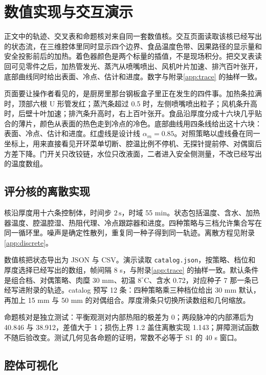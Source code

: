 \chapter{数值实现与交互演示}
\label{ch:demo}

正文中的轨迹、交叉表和命题核对来自同一套数值核。交互页面读取该核已经写出的状态流，在三维腔体里同时显示四个边界、食品温度色带、因果路径的显示量和安全投影前后的加热。着色器颜色是两个标量的插值，不是现场积分。把交叉表读回可见零件之后，加热管发光、蒸汽从喷嘴喷出、风机叶片加速、排汽百叶张开，底部曲线同时给出表面、冷点、估计和进度。数字与附录\ref{app:trace} 的抽样一致。

页面要让操作者看见的，是厨房里那台钢板盒子里正在发生的四件事。加热条拉满时，顶部六根 U 形管发红；蒸汽条超过 0.5 时，左侧喷嘴喷出粒子；风机条升高时，后壁十叶加速；排汽条升高时，右上百叶张开。食品沿厚度分成十六块几乎贴合的薄片，颜色从表面的热色走到冷点的冷色。底部曲线用四条线给出这十六块：表面、冷点、估计和进度。红虚线是设计线 \(\alpha_m=0.85\)。对照策略以虚线叠在同一坐标上，用来直接看见开环菜单切断、腔温比例不停机、无探针提前停、对偶窗后方差下降。门开关只改铰链，水位只改液面，二者进入安全侧测量，不改已经写出的温度数组。

\section{评分核的离散实现}

核沿厚度用十六条控制体，时间步 \(2\,\mathrm{s}\)，时域 55 min。状态包括温度、含水、加热器温度、腔温腔湿、热阻代理、冷点跟踪器和进度。四种策略与三档允许集合写在同一循环里。噪声是确定性散列，重复同一种子得到同一轨迹。离散方程见附录\ref{app:discrete}。

数值核把状态导出为 JSON 与 CSV。演示读取 \texttt{catalog.json}，按策略、档位和厚度选择已经写出的数组，帧间隔 8 s，与附录\ref{app:trace} 的抽样一致。默认条件是组合档、对偶策略、肉糜 30 mm、初温 \(8^\circ\mathrm{C}\)、含水 0.72，对应种子 7 那一条已经写进附录的轨迹。catalog 预写 12 条：四种策略乘三种档位给出 30 mm 默认，再加上 15 mm 与 50 mm 的对偶组合。厚度滑条只切换所读数组和几何缩放。

命题核对是独立测试：平衡观测对内部热阻的极差为 0；两段脉冲的内部滞后为 40.846 与 38.912，差值大于 1；损伤上界 1.2 盖住离散实现 1.143；屏障测试函数不随后验改变。测试几何见各命题的证明，常数不必等于 S1 的 40 s 窗口。

\section{腔体可视化}

